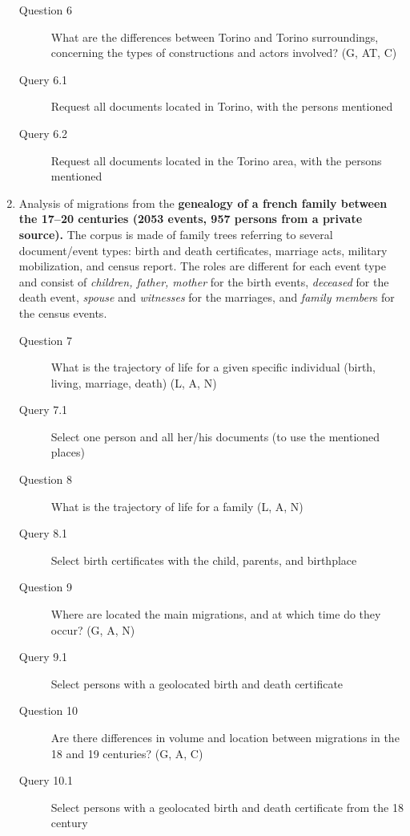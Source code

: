 \begin{enumerate}
\begin{footnotesize}
\begin{description}
    \item[Question 6] What are the differences between Torino and Torino surroundings, concerning the types of constructions and actors involved? (G, AT, C)
    \item[\myindent Query 6.1] Request all documents located in Torino, with the persons mentioned
    \item[\myindent Query 6.2] Request all documents located in the Torino area, with the persons mentioned
    \end{description}
    \end{footnotesize}

    \item Analysis of migrations from the \textbf{genealogy of a french family between the 17--20 centuries (2053 events, 957 persons from a private source).}
    The corpus is made of family trees referring to several document/event types: birth and death certificates, marriage acts, military mobilization, and census report. The roles are different for each event type and consist of \textit{children, father, mother} for the birth events, \textit{deceased} for the death event, \textit{spouse} and \textit{witnesses} for the marriages, and \textit{family member}s for the census events.
    \begin{footnotesize}
    \begin{description}
    \item[Question 7] What is the trajectory of life for a given specific individual (birth, living, marriage, death) (L, A, N)
    \item[\myindent Query 7.1] Select one person and all her/his documents (to use the mentioned places)
    \item[Question 8] What is the trajectory of life for a family (L, A, N)
    \item[\myindent Query 8.1] Select birth certificates with the child, parents, and birthplace
    \item[Question 9] Where are located the main migrations, and at which time do they occur? (G, A, N)
    \item[\myindent Query 9.1] Select persons with a geolocated birth and death certificate
    \item[Question 10] Are there differences in volume and location between migrations in the 18 and 19 centuries? (G, A, C)
    \item[\myindent Query 10.1] Select persons with a geolocated birth and death certificate from the 18 century

\end{description}
\end{footnotesize}
\end{enumerate}
